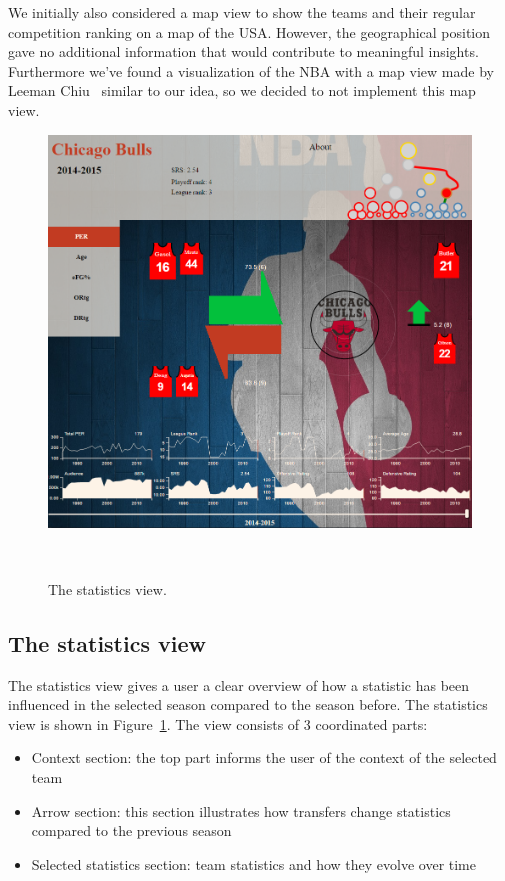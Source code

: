 \documentclass[]{sigchi}
\begin{document}

We initially also considered a map view to show the teams and their regular
competition ranking on a map of the USA. However, the geographical position gave
no additional information that would contribute to meaningful insights. Furthermore we've found a visualization of the NBA with a map view made by Leeman Chiu~\cite{mapviewvisualization} similar to our idea, so we decided to not implement this map view. 

\begin{figure}
\centering
  \includegraphics[width=1.0\columnwidth]{figures/statisticsview}
  \caption{The statistics view.}~\label{fig:statisticsview}
\end{figure}

\subsection{The statistics view}
The statistics view gives a user a clear overview of how a statistic has been
influenced in the selected season compared to the season before. The statistics
view is shown in Figure~\ref{fig:statisticsview}. The view consists of 3
coordinated parts:
\begin{itemize}
    \item Context section: the top part informs the user of the context of the
        selected team
    \item Arrow section: this section illustrates how transfers change statistics
        compared to the previous season
    \item Selected statistics section: team statistics and how they evolve over
        time
\end{itemize}
\end{document}
